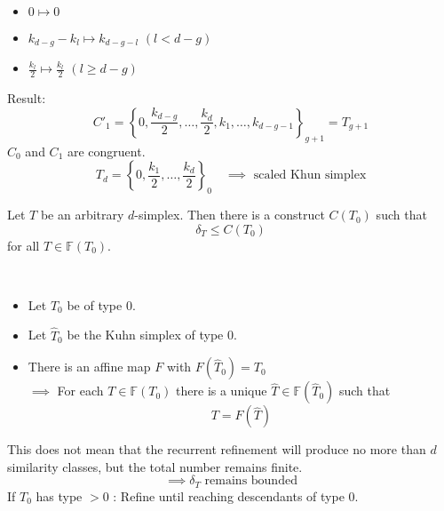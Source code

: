 \begin{proof_}
\begin{enumerate}
			\begin{itemize}
				\item $0 \mapsto 0$ 
				\item $k_{d-g}-k_{l} \mapsto k_{d-g-l}$ $(l< d-g)$ 
				\item $\frac{k_{l}}{2}\mapsto \frac{k_{l}}{2}$ $(l \geq d-g)$
			\end{itemize}
	\end{enumerate}
	Result:
	\begin{equation*}
		C'_{1}= \left\{ 0, \frac{k_{d-g}}{2},\dots ,\frac{k_{d}}{2},k_{1},\dots ,k_{d-g-1} \right\}_{g+1} = T_{g+1}
	\end{equation*}
	$C_{0}$ and $C_{1}$ are congruent.
	\begin{equation*}
		T_{d}= \left\{ 0, \frac{k_{1}}{2},\dots ,\frac{k_{d}}{2} \right\}_{0} \quad \implies \text{ scaled Khun simplex}
	\end{equation*}
\end{proof_}
\begin{theorem}
	Let $T$ be an arbitrary $d$-simplex. Then there is a construct $C(T_{0})$ such that
	\begin{equation*}
		\delta_{T} \leq C(T_{0})
	\end{equation*}
	for all $T \in \mathbb{F}(T_{0})$.
\end{theorem}
\begin{proof_}\
	\begin{itemize}
		\item Let $T_{0}$ be of type 0.
		\item Let $\hat{T}_{0}$ be the Kuhn simplex of type 0.
		\item There is an affine map $F$ with $F(\hat{T}_{0})=T_{0}$ \\
			$\implies$ For each $T \in \mathbb{F}(T_{0})$ there is a unique $\hat{T} \in \mathbb{F}(\hat{T}_{0})$ such that
			\begin{equation*}
				T = F(\hat{T})
			\end{equation*}
			
	\end{itemize}
	This does not mean that the recurrent refinement will produce no more than $d$ similarity classes, but the total number remains finite.
	 \begin{equation*}
		 \implies \delta_{T} \text{ remains bounded}
	\end{equation*}
	If $T_{0}$ has type $>0$ : Refine until reaching descendants of type $0$.
\end{proof_}



